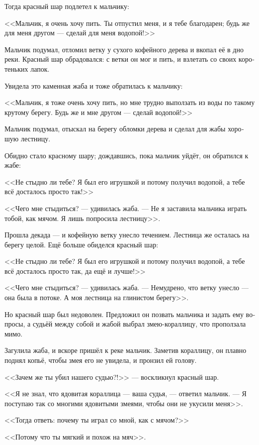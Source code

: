 \documentclass[a4paper,12pt,fleqn]{book}\usepackage{polyglossia}\setdefaultlanguage[babelshorthands=true]{russian}\setotherlanguage{english}\defaultfontfeatures{Ligatures=TeX,Mapping=tex-text}\usepackage{xcolor}\newcommand{\ml}[3]{#2}
\begin{document}
{Тогда красный шар подлетел к мальчику:

<<Мальчик, я очень хочу пить.
Ты отпустил меня, и я тебе благодарен;
будь же для меня другом --- сделай для меня водопой!>>

Мальчик подумал, отломил ветку у сухого кофейного дерева и вкопал её в дно реки.
Красный шар обрадовался: с ветки он мог и пить, и взлетать со своих коротеньких лапок.

Увидела это каменная жаба и тоже обратилась к мальчику:

<<Мальчик, я тоже очень хочу пить, но мне трудно выползать из воды по такому крутому берегу.
Будь же и мне другом --- сделай водопой!>>

Мальчик подумал, отыскал на берегу обломки дерева и сделал для жабы хорошую лестницу.

Обидно стало красному шару;
дождавшись, пока мальчик уйдёт, он обратился к жабе:

<<Не стыдно ли тебе?
Я был его игрушкой и потому получил водопой, а тебе всё досталось просто так!>>

<<Чего мне стыдиться? --- удивилась жаба.
--- Не я заставила мальчика играть тобой, как мячом.
Я лишь попросила лестницу>>.

Прошла декада --- и кофейную ветку унесло течением.
Лестница же осталась на берегу целой.
Ещё больше обиделся красный шар:

<<Не стыдно ли тебе?
Я был его игрушкой и потому получил водопой, а тебе всё досталось просто так, да ещё и лучше!>>

<<Чего мне стыдиться? --- удивилась жаба.
--- Немудрено, что ветку унесло --- она была в потоке.
А моя лестница на глинистом берегу>>.

Но красный шар был недоволен.
Предложил он позвать мальчика и задать ему вопросы, а судьёй между собой и жабой выбрал змею-кораллицу, что проползала мимо.

Загулила жаба, и вскоре пришёл к реке мальчик.
Заметив кораллицу, он плавно поднял копьё, чтобы змея его не увидела, и пронзил ей голову.

<<Зачем же ты убил нашего судью?!>> --- воскликнул красный шар.

<<Я не знал, что ядовитая кораллица --- ваша судья, --- ответил мальчик.
--- Я поступаю так со многими ядовитыми змеями, чтобы они не укусили меня>>.

<<Тогда ответь: почему ты играл со мной, как с мячом?>>

<<Потому что ты мягкий и похож на мяч>>.

}
\end{document}
